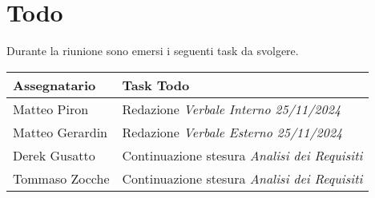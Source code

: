 \section{Todo}
Durante la riunione sono emersi i seguenti task da svolgere.

\begin{center}
  \begin{tabular}{|L{5cm}|L{8cm}|}
    \hline
    \textbf{Assegnatario} & \textbf{Task Todo} \\ \hline
    Matteo Piron    &  Redazione \textsl{Verbale Interno 25/11/2024}  \\ \hline
    Matteo Gerardin    &  Redazione \textsl{Verbale Esterno 25/11/2024}  \\ \hline
    Derek Gusatto    &  Continuazione stesura \textsl{Analisi dei Requisiti}  \\ \hline
    Tommaso Zocche    &  Continuazione stesura \textsl{Analisi dei Requisiti}  \\ \hline
  \end{tabular}
\end{center}